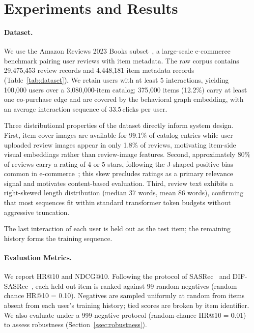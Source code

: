 \section{Experiments and Results}
\label{sec:exp}

\paragraph{Dataset.}
We use the Amazon Reviews 2023 Books subset~\cite{hou2024amazon}, a large-scale
e-commerce benchmark pairing user reviews with item metadata.
The raw corpus contains 29{,}475{,}453 review records and 4{,}448{,}181 item metadata
records (Table~\ref{tab:dataset}).
We retain users with at least 5 interactions, yielding 100{,}000 users over a
3{,}080{,}000-item catalog; 375{,}000 items (12.2\%) carry at least one co-purchase edge
and are covered by the behavioral graph embedding, with an average interaction
sequence of 33.5\,clicks per user.



Three distributional properties of the dataset directly inform system design.
First, item cover images are available for 99.1\% of catalog entries while
user-uploaded review images appear in only 1.8\% of reviews, motivating
item-side visual embeddings rather than review-image features.
Second, approximately 80\% of reviews carry a rating of 4 or 5 stars,
following the J-shaped positive bias common in e-commerce~\cite{hou2024amazon};
this skew precludes ratings as a primary relevance signal and motivates
content-based evaluation.
Third, review text exhibits a right-skewed length distribution (median 37 words,
mean 86 words), confirming that most sequences fit within standard transformer
token budgets without aggressive truncation.

The last interaction of each user is held out as the test item; the remaining
history forms the training sequence.

\paragraph{Evaluation Metrics.}
We report HR@10 and NDCG@10.
Following the protocol of SASRec~\cite{kang2018self} and
DIF-SASRec~\cite{xie2022difsr}, each held-out item is ranked against 99 random
negatives (random-chance HR@10 = 0.10).
Negatives are sampled uniformly at random from items absent from each user's
training history; tied scores are broken by item identifier.
We also evaluate under a 999-negative protocol (random-chance HR@10 = 0.01)
to assess robustness (Section~\ref{ssec:robustness}).

